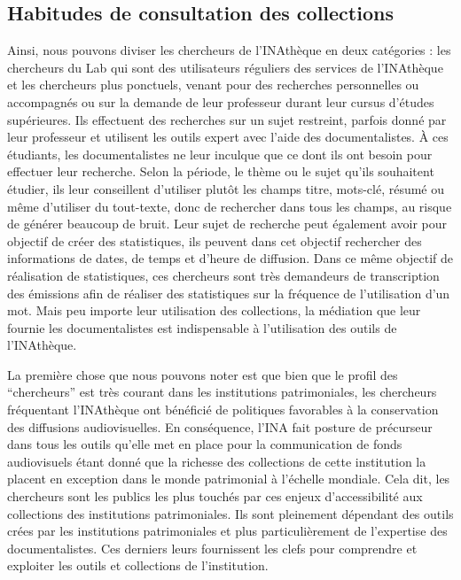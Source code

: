 \subsection{Habitudes de consultation des collections}

Ainsi, nous pouvons diviser les chercheurs de l'INAthèque en deux catégories : les chercheurs du Lab qui sont des utilisateurs réguliers des services de l'INAthèque et les chercheurs plus ponctuels, venant pour des recherches personnelles ou accompagnés ou sur la demande de leur professeur durant leur cursus d'études supérieures. Ils effectuent des recherches sur un sujet restreint, parfois donné par leur professeur et utilisent les outils expert avec l'aide des documentalistes. À ces étudiants, les documentalistes ne leur inculque que ce dont ils ont besoin pour effectuer leur recherche. Selon la période, le thème ou le sujet qu'ils souhaitent étudier, ils leur conseillent d'utiliser plutôt les champs titre, mots-clé, résumé ou même d'utiliser du tout-texte, donc de rechercher dans tous les champs, au risque de générer beaucoup de bruit. Leur sujet de recherche peut également avoir pour objectif de créer des statistiques, ils peuvent dans cet objectif rechercher des informations de dates, de temps et d'heure de diffusion. Dans ce même objectif de réalisation de statistiques, ces chercheurs sont très demandeurs de transcription des émissions afin de réaliser des statistiques sur la fréquence de l'utilisation d'un mot. Mais peu importe leur utilisation des collections, la médiation que leur fournie les documentalistes est indispensable à l'utilisation des outils de l'INAthèque. 


La première chose que nous pouvons noter est que bien que le profil des \enquote{chercheurs} est très courant dans les institutions patrimoniales, les chercheurs fréquentant l'INAthèque ont bénéficié de politiques favorables à la conservation des diffusions audiovisuelles. En conséquence, l'INA fait posture de précurseur dans tous les outils qu'elle met en place pour la communication de fonds audiovisuels étant donné que la richesse des collections de cette institution la placent en exception dans le monde patrimonial à l'échelle mondiale. Cela dit, les chercheurs sont les publics les plus touchés par ces enjeux d'accessibilité aux collections des institutions patrimoniales. Ils sont pleinement dépendant des outils crées par les institutions patrimoniales et plus particulièrement de l'expertise des documentalistes. Ces derniers leurs fournissent les clefs pour comprendre et exploiter les outils et collections de l'institution. 